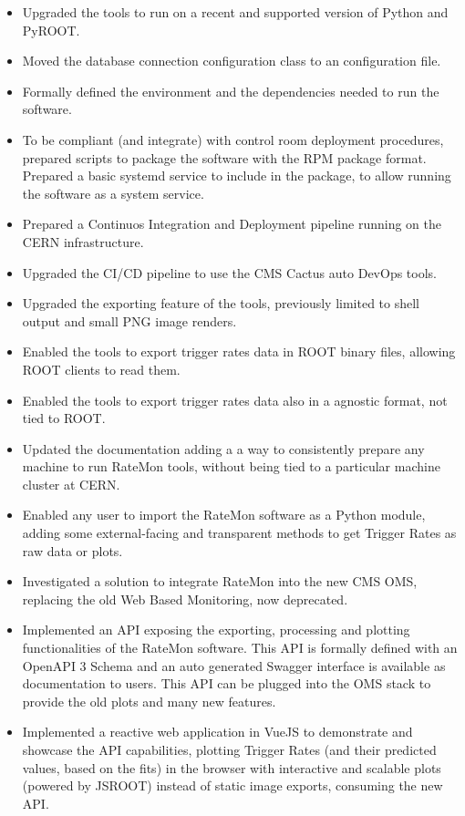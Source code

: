 \documentclass[a4, oneside, 11pt, nobib]{memoir}
\begin{document}
		\begin{itemize}

		\item Upgraded the tools to run on a recent and supported version of Python and PyROOT.
		\item Moved the database connection configuration class to an configuration file.
		\item Formally defined the environment and the dependencies needed to run the software.
		\item To be compliant (and integrate) with control room deployment procedures, prepared scripts to package the software with the RPM package format. Prepared a basic systemd service to include in the package, to allow running the software as a system service.
		\item Prepared a Continuos Integration and Deployment pipeline running on the CERN infrastructure.
		\item Upgraded the CI/CD pipeline to use the CMS Cactus \cite{DirkxCactus} auto DevOps tools.
		\item Upgraded the exporting feature of the tools, previously limited to shell output and small PNG image renders.
		\item Enabled the tools to export trigger rates data in ROOT binary files, allowing ROOT clients to read them.
		\item Enabled the tools to export trigger rates data also in a agnostic format, not tied to ROOT.
		\item Updated the documentation adding a a way to consistently prepare any machine to run RateMon tools, without being tied to a particular machine cluster at CERN.
		\item Enabled any user to import the RateMon software as a Python module, adding some external-facing and transparent methods to get Trigger Rates as raw data or plots.
		\item Investigated a solution to integrate RateMon into the new CMS OMS, replacing the old Web Based Monitoring, now deprecated.
		\item Implemented an API exposing the exporting, processing and plotting functionalities of the RateMon software. This API is formally defined with an OpenAPI 3 Schema and an auto generated Swagger interface is available as documentation to users. This API can be plugged into the OMS stack to provide the old plots and many new features.
		\item Implemented a reactive web application in VueJS to demonstrate and showcase the API capabilities, plotting Trigger Rates (and their predicted values, based on the fits) in the browser with interactive and scalable plots (powered by JSROOT) instead of static image exports, consuming the new API.

\end{itemize}
\end{document}
